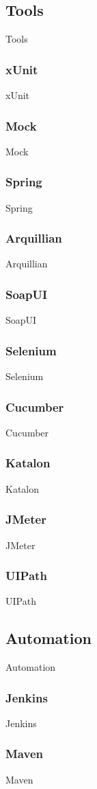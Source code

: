 \subsection{Tools}\label{subsec:tools}
Tools

\subsubsection{xUnit}
xUnit

\subsubsection{Mock}
Mock

\subsubsection{Spring}
Spring

\subsubsection{Arquillian}
Arquillian

\subsubsection{SoapUI}
SoapUI

\subsubsection{Selenium}
Selenium

\subsubsection{Cucumber}
Cucumber

\subsubsection{Katalon}
Katalon

\subsubsection{JMeter}
JMeter

\subsubsection{UIPath}
UIPath


\subsection{Automation}\label{subsec:automation}
Automation

\subsubsection{Jenkins}
Jenkins

\subsubsection{Maven}
Maven
